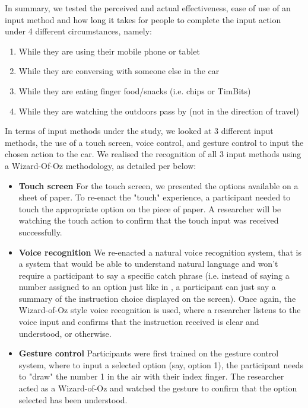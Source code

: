 \documentclass{sigchi}
\begin{document}
In summary, we tested the perceived and actual effectiveness, ease of use of an input method and how long it takes for people to complete the input action under 4 different circumstances, namely:
\begin{enumerate}
\item While they are using their mobile phone or tablet
\item While they are conversing with someone else in the car
\item While they are eating finger food/snacks (i.e. chips or TimBits)
\item While they are watching the outdoors pass by (not in the direction of travel)
\end{enumerate}

In terms of input methods under the study, we looked at 3 different input methods, the use of a touch screen, voice control, and gesture control to input the chosen action to the car. We realised the recognition of all 3 input methods using a Wizard-Of-Oz methodology, as detailed per below:
\begin{itemize}
\item \textbf{Touch screen}
\newline
For the touch screen, we presented the options available on a sheet of paper. To re-enact the "touch" experience, a participant needed to touch the appropriate option on the piece of paper. A researcher will be watching the touch action to confirm that the touch input was received successfully.
\item \textbf{Voice recognition}
\newline
We re-enacted a natural voice recognition system, that is a system that would be able to understand natural language and won't require a participant to say a specific catch phrase (i.e. instead of saying a number assigned to an option just like in \cite{Walch2016}, a participant can just say a summary of the instruction choice displayed on the screen). Once again, the Wizard-of-Oz style voice recognition is used, where a researcher listens to the voice input and confirms that the instruction received is clear and understood, or otherwise.
\item \textbf{Gesture control}
\newline
Participants were first trained on the gesture control system, where to input a selected option (say, option 1), the participant needs to "draw" the number 1 in the air with their index finger. The researcher acted as a Wizard-of-Oz and watched the gesture to confirm that the option selected has been understood.
\end{itemize}
\end{document}
